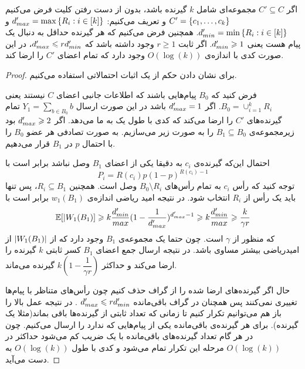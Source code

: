 \begin{lemma}
    \label{lemma:pliable2015:3}
    اگر
    $C' \subseteq C$
    مجموعه‌ای شامل
    $k$
    گیرنده‌ باشد، بدون از دست رفتن کلیت فرض می‌کنیم
    $C' = \left\{ c_1, \ldots, c_k \right\}$
    و تعریف می‌کنیم:
    $d_{max}' = \max\left\{ R_i: i \in [k]  \right\}$
    و
    $d_{min}' = \min\left\{ R_i: i \in [k]  \right\}$. همچنین فرض می‌کنیم که هر گیرنده حداقل به دنبال یک پیام هست یعنی
    $d_{min}' \geqslant 1$. اگر ثابت
    $r \geq 1$
    وجود داشته باشد که
    $d_{max}' \leqslant r d_{min}'$، در این صورت کدی با اندازه‌ی
    $O(\log(k))$
    وجود دارد که تمام اعضای
    $C'$
    را ارضا کند.
\end{lemma}
\begin{proof}
    برای نشان دادن حکم از یک اثبات احتمالاتی استفاده می‌کنیم.

    فرض کنید که
    $B_0$
    پیام‌هایی باشند که اطلاعات جانبی اعضای
    $C$
    نیستند یعنی
    $B_0 = \cup_{i = 1}^{k} R_i$. اگر
    $d_{max}' = 1$
    باشد در این صورت ارسال
    $Y_1 = \sum_{b \in B_0} b$
    تمام گیرنده‌های
    $C'$
    را ارضا می‌کند که کدی با طول یک به ما می‌دهد. اگر
    $d_{max}' \geqslant 2$
    بود زیرمجموعه‌ی
    $B_1 \subseteq B_0$
    را به صورت زیر می‌سازیم. به صورت تصادفی هر عضو
    $B_0$
    را با احتمال
    $p$
    در
    $B_1$
    قرار می‌دهیم.

    احتمال این‌که گیرنده‌ی
    $c_i$
    به دقیقا یکی از اعضای
    $B_1$
    وصل نباشد برابر است با
    $$P_i = R(c_i) p (1 - p)^{R(c_i) - 1}$$
    توجه کنید که رأس
    $c_i$
    به تمام رأس‌های
    $B_0 \setminus R_i$
    وصل است. همچنین
    $R_i \subseteq B_1$، پس تنها باید یک رأس از
    $R_i$
    انتخاب شود. در نتیجه امید ریاضی اندازه‌ی
    $w_1(B_1)$
    برابر است با
    \begin{equation}
        \mathbb{E}[|W_1(B_1)] \geqslant k \dfrac{d_{min}'}{max}(1 - \dfrac{1}{d_{max}'})^{d_{max}' - 1} \geqslant k \dfrac{d_{min}'}{max} \geqslant \dfrac{k}{\gamma r}
    \end{equation}
    که منظور از
    $\gamma$
    است. چون حتما یک مجموعه‌ی
    $B_1$
    وجود دارد که از
    $\left|{W_1(B_1)}\right|$
    از امیدریاضی بیشتر مساوی باشد. در نتیجه ارسال جمع اعضای
    $B_1$
    کسر ثابتی
    $k$
    گیرنده‌ را ارضا می‌کند و حداکثر
    $k(1 - \dfrac{1}{\gamma r})$
    گیرنده می‌ماند.

    حال اگر گیرنده‌های ارضا شده را از گراف حذف کنیم چون رأس‌های متناظر با پیام‌ها تغییری نمی‌کنند پس همچنان در گراف باقی‌مانده
    $d_{max}' \leqslant r d_{min}'$
    . در نتیجه عمل بالا را باز هم می‌توانیم تکرار کنیم تا زمانی که تعداد ثابتی از گیرنده‌ها باقی بماند(مثلا یک گیرنده). برای هر گیرنده‌ی باقی‌مانده یکی از پیام‌هایی که ندارد را ارسال می‌کنیم. چون در هر گام تعداد گیرنده‌های باقی‌مانده با یک ضریب کم می‌شود حداکثر در
    $O(\log(k))$
    مرحله این تکرار تمام می‌شود و کدی با طول
    $O(\log(k))$
    به دست می‌آید.
\end{proof}

